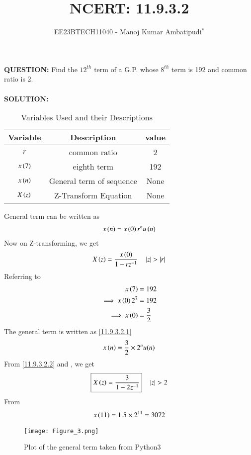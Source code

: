 \documentclass[journal,12pt,twocolumn]{IEEEtran}
\theoremstyle{remark}
\begin{document}

\vspace{3cm}
\title{NCERT: 11.9.3.2}
\author{EE23BTECH11040 - Manoj Kumar Ambatipudi$^{*}$%
}
\maketitle
\newpage
\bigskip
\renewcommand{\thefigure}{\theenumi}
\renewcommand{\thetable}{\theenumi}
\textbf{QUESTION:}
Find the $12^{th}$ term of a G.P. whose $8^{th}$ term is 192 and common ratio is 2.\\\\
\textbf{SOLUTION:}
\begin{table}[h!!]
\renewcommand\thetable{1}
    \centering
    \begin{tabular}{|c|c|c|}
    \hline
        Variable&             Description&value\\\hline
             $r$&            common ratio&2    \\\hline
     $x\left(7\right)$&              eighth term&192  \\\hline
     $x\left(n\right)$&General term of sequence&None \\\hline
     $X\left(z\right)$&    Z-Transform Equation&None \\\hline
    \end{tabular}
    \caption{Variables Used and their Descriptions}
    \label{tab 11.9.3.2.1}
\end{table}


General term can be written as 
\begin{align}
    x\left(n\right)=x\left(0\right)r^{n}u\left(n\right)\label{11.9.3.2.1}
\end{align}
Now on Z-transforming, we get
\begin{align}
    X\left(z\right)=\frac{x\left(0\right)}{1-rz^{-1}}\label{11.9.3.2.2} \quad   \left\vert z\right\vert>\left\vert r\right\vert
\end{align}
Referring to 
\begin{align}
         x\left(7\right)&=192\\
\implies x\left(0\right)2^{7}&=192\\
\implies x\left(0\right)&=\frac{3}{2}
\end{align}
The general term is written as \eqref{11.9.3.2.1}
\begin{align}
    x\left(n\right)=\frac{3}{2}\times2^{n}u(n)
\end{align}
From \eqref{11.9.3.2.2} and , we get
\begin{align}
   \boxed{X\left(z\right)=\frac{3}{1-2z^{-1}}}\quad   \left\vert z\right\vert>2
\end{align}
From  
\begin{align}
x\left(11\right) = 1.5\times2^{11} = 3072
\end{align}
\begin{figure}[h]
\renewcommand\thefigure{1} 
    \centering
    \texttt{[image: Figure\_3.png]}
    \caption{Plot of the general term taken from Python3}
    \label{fig:1}
\end{figure}
\end{document}

